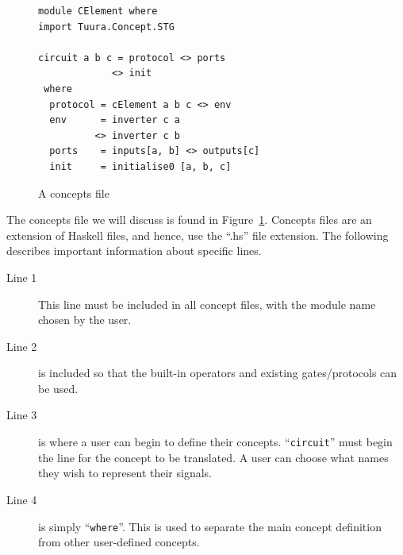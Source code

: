 \documentclass[british, 10pt, conference, compsocconf]{IEEEtran}
\begin{document}
\begin{figure}[h]
\begin{centering}
\vspace{-1mm}
\begin{verbatim}
module CElement where
import Tuura.Concept.STG

circuit a b c = protocol <> ports 
             <> init 
 where
  protocol = cElement a b c <> env
  env      = inverter c a 
          <> inverter c b
  ports    = inputs[a, b] <> outputs[c] 
  init     = initialise0 [a, b, c]
\end{verbatim}

\par\end{centering}
\begin{centering}
\protect\caption{\label{fig:concepts_file}A concepts file}
\vspace{-1mm}
\par\end{centering}

\end{figure}

The concepts file we will discuss is found in Figure~\ref{fig:concepts_file}.
Concepts files are an extension of Haskell files, and hence, use the ``.hs'' file extension.
The following describes important information about specific lines.


\begin{description}
  \item [Line 1]  This line must be included in all concept files, with the 
  module name chosen by the user.
  
  \item [Line 2] is included so that the built-in operators and existing 
  gates/protocols can be used. 
  
  \item [Line 3] is where a user can begin to define their concepts. 
  ``\texttt{circuit}'' must begin the line for the concept to be translated.
  A user can choose what names they wish to represent their signals.
  
  \item [Line 4] is simply ``\texttt{where}''. This is used to separate the main
  concept definition from other user-defined concepts.

\end{description}
\end{document}
